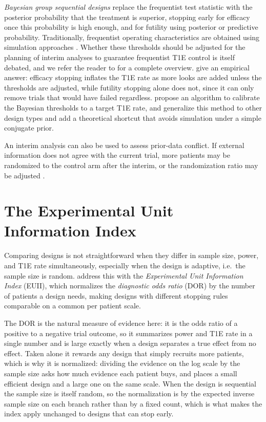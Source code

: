 \textit{Bayesian group sequential designs} replace the frequentist test statistic with the posterior probability that the treatment is superior, 
stopping early for efficacy once this probability is high enough, and for futility using posterior or predictive probability. Traditionally, 
frequentist operating characteristics are obtained using simulation approaches \citep{berry2010bayesian}.
Whether these thresholds should be adjusted for the planning of interim analyses to guarantee frequentist T1E control is itself debated, 
and we refer the reader to \citet{zhou_ji_2024} for a complete overview. \citet{ryan2020we} give an empirical answer: efficacy 
stopping inflates the T1E rate as more looks are added unless the thresholds are adjusted, while futility stopping alone does not, 
since it can only remove trials that would have failed regardless. \citet{zhu2017bayesian} propose an algorithm to calibrate the Bayesian thresholds to a target T1E rate, and \citet{shi2019control} 
generalize this method to other design types and add a theoretical shortcut that avoids simulation under a simple conjugate prior. 

An interim analysis can also be used to assess prior-data conflict. If external information does not agree with the current trial,
more patients may be randomized to the control arm after the interim, or the randomization ratio may be adjusted \citep{schmidli_robust_2014}.


\section{The Experimental Unit Information Index}
\label{subsec:euii_intro}
Comparing designs is not straightforward when they differ in sample size, power, and T1E rate simultaneously, especially when
the design is adaptive, i.e.\ the sample size is random. \citet{held2025balancing} address this with the \textit{Experimental Unit
Information Index} (EUII), which normalizes the \textit{diagnostic odds ratio} (DOR) by the number of patients a design needs, making
designs with different stopping rules comparable on a common per patient scale.

The DOR is the natural measure of evidence here: it is the odds ratio of a positive to a negative trial outcome, so it
summarizes power and T1E rate in a single number and is large exactly when a design separates a true effect from no effect.
Taken alone it rewards any design that simply recruits more patients, which is why it is normalized: dividing the evidence on
the log scale by the sample size asks how much evidence each patient buys, and places a small efficient design and a large
one on the same scale. When the design is sequential the sample size is itself random, so the normalization is by the
expected inverse sample size on each branch rather than by a fixed count, which is what makes the index apply unchanged to
designs that can stop early.


